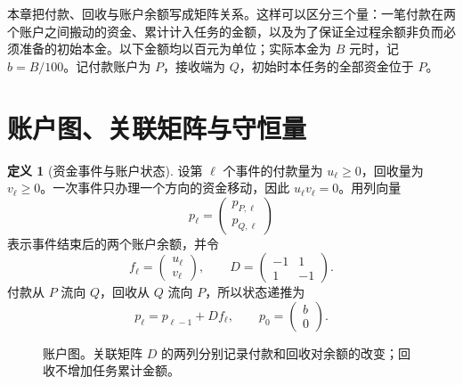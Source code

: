 \documentclass[UTF8,a4paper]{ctexbook}
\theoremstyle{definition}
\newtheorem{definition}[theorem]{定义}
\numberwithin{equation}{chapter}
\newcommand{\1}{\mathbf{1}}
\begin{document}
本章把付款、回收与账户余额写成矩阵关系。这样可以区分三个量：一笔付款在两个账户之间搬动的资金、累计计入任务的金额，以及为了保证全过程余额非负而必须准备的初始本金。以下金额均以百元为单位；实际本金为 $B$ 元时，记 $b=B/100$。记付款账户为 $P$，接收端为 $Q$，初始时本任务的全部资金位于 $P$。

\section{账户图、关联矩阵与守恒量}

\begin{definition}[资金事件与账户状态]\label{la:state-def}
设第 $\ell$ 个事件的付款量为 $u_\ell\ge0$，回收量为 $v_\ell\ge0$。一次事件只办理一个方向的资金移动，因此 $u_\ell v_\ell=0$。用列向量
\[
p_\ell=\begin{pmatrix}p_{P,\ell}\\p_{Q,\ell}\end{pmatrix}
\]
表示事件结束后的两个账户余额，并令
\[
f_\ell=\begin{pmatrix}u_\ell\\v_\ell\end{pmatrix},
\qquad
D=\begin{pmatrix}-1&1\\1&-1\end{pmatrix}.
\]
付款从 $P$ 流向 $Q$，回收从 $Q$ 流向 $P$，所以状态递推为
\begin{equation}\label{la:incidence-update}
p_\ell=p_{\ell-1}+Df_\ell,
\qquad p_0=\begin{pmatrix}b\\0\end{pmatrix}.
\end{equation}
\end{definition}

\begin{figure}[htbp]
\centering
{}
\caption{账户图。关联矩阵 $D$ 的两列分别记录付款和回收对余额的改变；回收不增加任务累计金额。}
\label{la:account-graph}
\end{figure}
\end{document}
